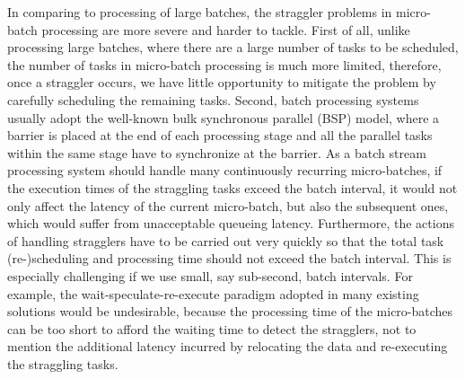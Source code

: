 In comparing to processing of large batches, the straggler problems in
micro-batch processing are more severe and harder to tackle. First of all,
unlike processing large batches, where there are a large number of tasks to be
scheduled, the number of tasks in micro-batch processing is much more limited,
therefore, once a straggler occurs, we have little opportunity to mitigate the
problem by carefully scheduling the remaining tasks.  Second, batch processing
systems usually adopt the well-known bulk synchronous parallel (BSP) model,
where a barrier is placed at the end of each processing stage and all the
parallel tasks within the same stage have to synchronize at the barrier.  As a
batch stream processing system should handle many continuously recurring
micro-batches, if the execution times of the straggling tasks exceed the batch
interval, it would not only affect the latency of the current micro-batch, but
also the subsequent ones, which would suffer from unacceptable queueing latency.
Furthermore, the actions of handling stragglers have to be carried out very
quickly so that the total task (re-)scheduling and processing time should not
exceed the batch interval. This is especially challenging if we use small, say
sub-second, batch intervals. For example, the wait-speculate-re-execute paradigm
adopted in many existing solutions \cite{Dean2004} \cite{Zaharia2008}
\cite{Kwon2012} would be undesirable, because the processing time of the
micro-batches can be too short to afford the waiting time to detect the
stragglers, not to mention the additional latency incurred by relocating the
data and re-executing the straggling tasks. 


